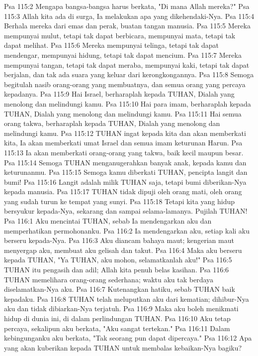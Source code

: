 Psa 115:2  Mengapa bangsa-bangsa harus berkata, "Di mana Allah mereka?"
Psa 115:3  Allah kita ada di surga, Ia melakukan apa yang dikehendaki-Nya.
Psa 115:4  Berhala mereka dari emas dan perak, buatan tangan manusia.
Psa 115:5  Mereka mempunyai mulut, tetapi tak dapat berbicara, mempunyai mata, tetapi tak dapat melihat.
Psa 115:6  Mereka mempunyai telinga, tetapi tak dapat mendengar, mempunyai hidung, tetapi tak dapat mencium.
Psa 115:7  Mereka mempunyai tangan, tetapi tak dapat meraba, mempunyai kaki, tetapi tak dapat berjalan, dan tak ada suara yang keluar dari kerongkongannya.
Psa 115:8  Semoga begitulah nasib orang-orang yang membuatnya, dan semua orang yang percaya kepadanya.
Psa 115:9  Hai Israel, berharaplah kepada TUHAN, Dialah yang menolong dan melindungi kamu.
Psa 115:10  Hai para imam, berharaplah kepada TUHAN, Dialah yang menolong dan melindungi kamu.
Psa 115:11  Hai semua orang takwa, berharaplah kepada TUHAN, Dialah yang menolong dan melindungi kamu.
Psa 115:12  TUHAN ingat kepada kita dan akan memberkati kita, Ia akan memberkati umat Israel dan semua imam keturunan Harun.
Psa 115:13  Ia akan memberkati orang-orang yang takwa, baik kecil maupun besar.
Psa 115:14  Semoga TUHAN menganugerahkan banyak anak, kepada kamu dan keturunanmu.
Psa 115:15  Semoga kamu diberkati TUHAN, pencipta langit dan bumi!
Psa 115:16  Langit adalah milik TUHAN saja, tetapi bumi diberikan-Nya kepada manusia.
Psa 115:17  TUHAN tidak dipuji oleh orang mati, oleh orang yang sudah turun ke tempat yang sunyi.
Psa 115:18  Tetapi kita yang hidup bersyukur kepada-Nya, sekarang dan sampai selama-lamanya. Pujilah TUHAN!
Psa 116:1  Aku mencintai TUHAN, sebab Ia mendengarkan aku dan memperhatikan permohonanku.
Psa 116:2  Ia mendengarkan aku, setiap kali aku berseru kepada-Nya.
Psa 116:3  Aku diancam bahaya maut; kengerian maut menyergap aku, membuat aku gelisah dan takut.
Psa 116:4  Maka aku berseru kepada TUHAN, "Ya TUHAN, aku mohon, selamatkanlah aku!"
Psa 116:5  TUHAN itu pengasih dan adil; Allah kita penuh belas kasihan.
Psa 116:6  TUHAN memelihara orang-orang sederhana; waktu aku tak berdaya diselamatkan-Nya aku.
Psa 116:7  Kutenangkan hatiku, sebab TUHAN baik kepadaku.
Psa 116:8  TUHAN telah meluputkan aku dari kematian; dihibur-Nya aku dan tidak dibiarkan-Nya terjatuh.
Psa 116:9  Maka aku boleh menikmati hidup di dunia ini, di dalam perlindungan TUHAN.
Psa 116:10  Aku tetap percaya, sekalipun aku berkata, "Aku sangat tertekan."
Psa 116:11  Dalam kebingunganku aku berkata, "Tak seorang pun dapat dipercaya."
Psa 116:12  Apa yang akan kuberikan kepada TUHAN untuk membalas kebaikan-Nya bagiku?
